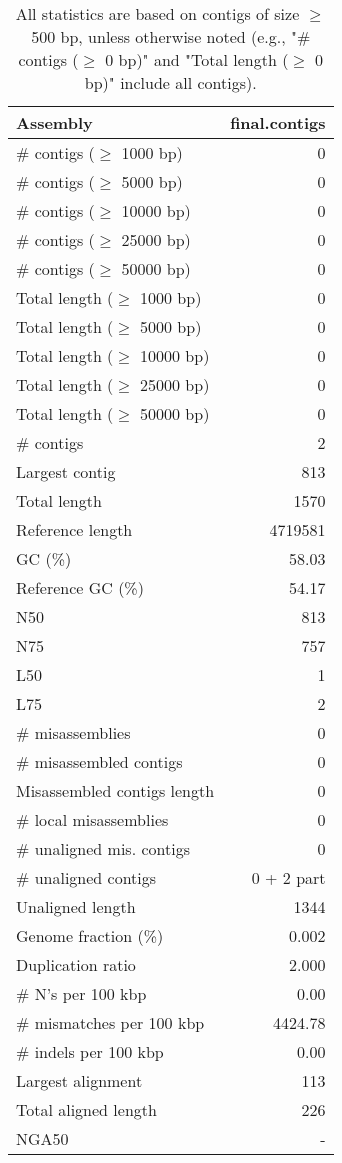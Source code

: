 \documentclass[12pt,a4paper]{article}
\begin{document}
\begin{table}[ht]
\begin{center}
\caption{All statistics are based on contigs of size $\geq$ 500 bp, unless otherwise noted (e.g., "\# contigs ($\geq$ 0 bp)" and "Total length ($\geq$ 0 bp)" include all contigs).}
\begin{tabular}{|l*{1}{|r}|}
\hline
Assembly & final.contigs \\ \hline
\# contigs ($\geq$ 1000 bp) & 0 \\ \hline
\# contigs ($\geq$ 5000 bp) & 0 \\ \hline
\# contigs ($\geq$ 10000 bp) & 0 \\ \hline
\# contigs ($\geq$ 25000 bp) & 0 \\ \hline
\# contigs ($\geq$ 50000 bp) & 0 \\ \hline
Total length ($\geq$ 1000 bp) & 0 \\ \hline
Total length ($\geq$ 5000 bp) & 0 \\ \hline
Total length ($\geq$ 10000 bp) & 0 \\ \hline
Total length ($\geq$ 25000 bp) & 0 \\ \hline
Total length ($\geq$ 50000 bp) & 0 \\ \hline
\# contigs & 2 \\ \hline
Largest contig & 813 \\ \hline
Total length & 1570 \\ \hline
Reference length & 4719581 \\ \hline
GC (\%) & 58.03 \\ \hline
Reference GC (\%) & 54.17 \\ \hline
N50 & 813 \\ \hline
N75 & 757 \\ \hline
L50 & 1 \\ \hline
L75 & 2 \\ \hline
\# misassemblies & 0 \\ \hline
\# misassembled contigs & 0 \\ \hline
Misassembled contigs length & 0 \\ \hline
\# local misassemblies & 0 \\ \hline
\# unaligned mis. contigs & 0 \\ \hline
\# unaligned contigs & 0 + 2 part \\ \hline
Unaligned length & 1344 \\ \hline
Genome fraction (\%) & 0.002 \\ \hline
Duplication ratio & 2.000 \\ \hline
\# N's per 100 kbp & 0.00 \\ \hline
\# mismatches per 100 kbp & 4424.78 \\ \hline
\# indels per 100 kbp & 0.00 \\ \hline
Largest alignment & 113 \\ \hline
Total aligned length & 226 \\ \hline
NGA50 & - \\ \hline
\end{tabular}
\end{center}
\end{table}
\end{document}
